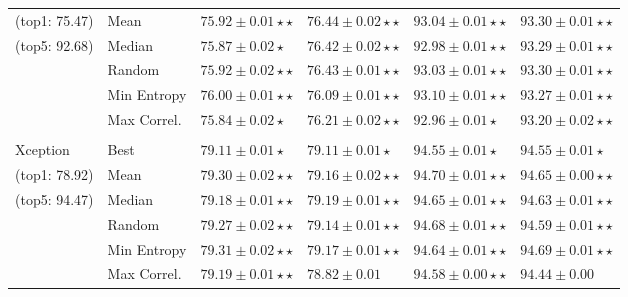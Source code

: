 \begin{table}[h!]
\begin{tabularx}{\textwidth}{XX|YY|YY}
	 (top1: 75.47)                    & Mean                     & $75.92 \pm 0.01 \star\star$          & $\mathbf{76.44 \pm 0.02} \star\star$ & $93.04 \pm 0.01\star\star$          & $93.30 \pm 0.01\star\star$          \\
	 (top5: 92.68)                    & Median                   & $ 75.87 \pm 0.02 \star$              & $ 76.42 \pm 0.02 \star\star$         & $92.98 \pm 0.01\star\star$          & $93.29 \pm 0.01\star\star$          \\
									& Random                   & $75.92 \pm 0.02 \star\star$          & $76.43 \pm 0.01 \star\star$          & $93.03 \pm 0.01\star\star$          & $93.30 \pm 0.01\star\star$          \\
									& Min Entropy              & $\mathbf{76.00\pm0.01\star\star}$    & $76.09\pm0.01\star\star$             & $\mathbf{93.10\pm0.01\star\star}$   & $\mathbf{93.27\pm0.01\star\star}$   \\
									& Max Correl.              & $75.84\pm0.02\star$                  & $76.21\pm0.02\star\star$             & $92.96\pm0.01\star$                 & $93.20\pm0.02\star\star$            \\
									&                          &                                      &                                      &                                     &                                     \\
	 { Xception}                    & Best                     & $79.11 \pm 0.01 \star$               & $79.11 \pm 0.01 \star$               & $94.55 \pm 0.01\star$               & $94.55 \pm 0.01\star$               \\
	 (top1: 78.92)                    & Mean                     & $\mathbf{79.30 \pm 0.02} \star\star$ & $79.16 \pm 0.02 \star\star$          & $\mathbf{94.70 \pm 0.01}\star\star$ & $94.65 \pm 0.00\star\star$          \\
	 (top5: 94.47)                    & Median                   & $79.18 \pm 0.01 \star\star$          & $\mathbf{79.19 \pm 0.01 \star\star}$ & $94.65 \pm 0.01\star\star$          & $94.63 \pm 0.01\star\star$          \\
									& Random                   & $79.27 \pm 0.02 \star\star$          & $79.14\pm 0.01 \star\star$           & $94.68 \pm 0.01\star\star$          & $94.59 \pm 0.01\star\star$          \\
									& Min Entropy              & $79.31\pm0.02\star\star$             & $\mathbf{79.17\pm0.01\star\star}$    & $94.64\pm0.01\star\star$            & $\mathbf{94.69\pm0.01\star\star}$   \\
									& Max Correl.              & $79.19\pm0.01\star\star$             & $78.82\pm0.01$                       & $94.58\pm0.00\star\star$            & $94.44\pm0.00$                      \\ \bottomrule
 \end{tabularx}
\label{tab:results1}


 \end{table}




